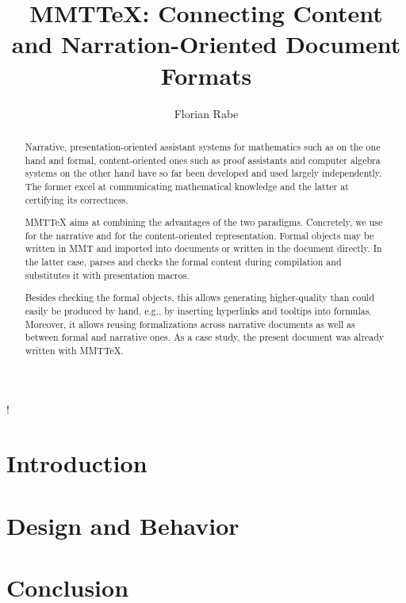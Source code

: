 \documentclass[orivec]{llncs}
\title{MMTTeX: Connecting Content and Narration-Oriented Document Formats}
\author{Florian Rabe}
\institute{Universities Paris-Sud and Erlangen-Nuremberg}
\newcommand{\mmttex}{MMTTeX\xspace}
\begin{document}
\maketitle
\begin{abstract}
Narrative, presentation-oriented assistant systems for mathematics such as \latex on the one hand and formal, content-oriented ones such as proof assistants and computer algebra systems on the other hand have so far been developed and used largely independently.
The former excel at communicating mathematical knowledge and the latter at certifying its correctness.

\mmttex aims at combining the advantages of the two paradigms.
Concretely, we use \latex for the narrative and {\mmt} for the content-oriented representation.
Formal objects may be written in MMT and imported into \latex documents or written in the \latex document directly.
In the latter case, \mmt parses and checks the formal content during \latex compilation and substitutes it with \latex presentation macros.

Besides checking the formal objects, this allows generating higher-quality \latex than could easily be produced by hand, e.g., by inserting hyperlinks and tooltips into formulas.
Moreover, it allows reusing formalizations across narrative documents as well as between formal and narrative ones.
As a case study, the present document was already written with \mmttex.
\end{abstract}


\lstMakeShortInline[basicstyle=]!

\section{Introduction}\label{sec:intro}
  

\section{Design and Behavior} \label{sec:pdflatex}
  
  
\section{Conclusion}\label{sec:conc}
  



\end{document}

